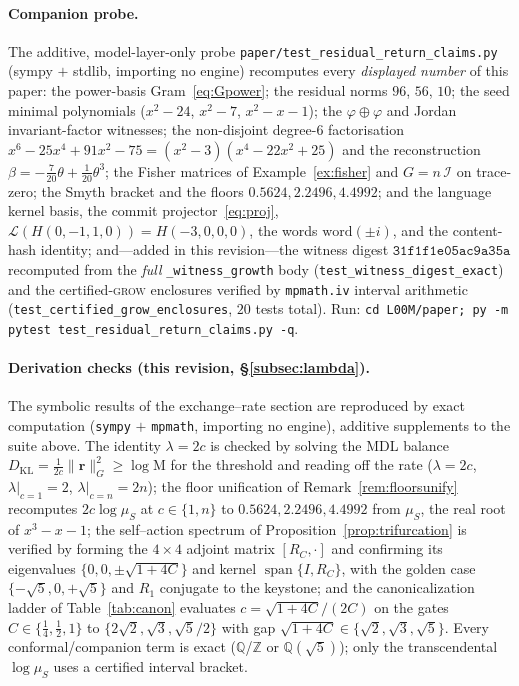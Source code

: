 \documentclass[11pt]{article}
\theoremstyle{plain}
\theoremstyle{definition}
\theoremstyle{remark}
\newcommand{\Q}{\mathbb{Q}}
\newcommand{\Z}{\mathbb{Z}}
\newcommand{\Mah}{\mathrm{M}}
\newcommand{\Fish}{\mathcal{I}}
\newcommand{\rr}{\mathbf{r}}
\newcommand{\GG}{G}
\newcommand{\Lop}{\mathcal{L}}
\DeclareMathOperator{\spn}{span}
\begin{document}
\paragraph{Companion probe.} The additive, model-layer-only probe
\texttt{paper/test\_residual\_return\_claims.py} (sympy $+$ stdlib, importing no engine) recomputes every
\emph{displayed number} of this paper: the power-basis Gram~\eqref{eq:Gpower}; the residual norms $96$, $56$,
$10$; the seed minimal polynomials ($x^2-24$, $x^2-7$, $x^2-x-1$); the $\varphi\oplus\varphi$ and Jordan
invariant-factor witnesses; the non-disjoint degree-$6$ factorisation
$x^6-25x^4+91x^2-75=(x^2-3)(x^4-22x^2+25)$ and the reconstruction
$\beta=-\tfrac7{20}\theta+\tfrac1{20}\theta^3$; the Fisher matrices of Example~\ref{ex:fisher} and
$\GG=n\,\Fish$ on trace-zero; the Smyth bracket and the floors $0.5624,2.2496,4.4992$; and the language
kernel basis, the commit projector~\eqref{eq:proj}, $\Lop(H(0,-1,1,0))=H(-3,0,0,0)$, the words
$\mathrm{word}(\pm i)$, and the content-hash identity; and---added in this revision---the witness digest
$\texttt{31f1f1e05ac9a35a}$ recomputed from the \emph{full} \texttt{\_witness\_growth} body
(\texttt{test\_witness\_digest\_exact}) and the certified-\textsc{grow} enclosures verified by
\texttt{mpmath.iv} interval arithmetic (\texttt{test\_certified\_grow\_enclosures}, $20$ tests total). Run:
\texttt{cd L00M/paper; py -m pytest test\_residual\_return\_claims.py -q}.

\paragraph{Derivation checks (this revision, \S\ref{subsec:lambda}).} The symbolic results of the exchange--rate
section are reproduced by exact computation (\texttt{sympy} $+$ \texttt{mpmath}, importing no engine), additive
supplements to the suite above. The identity $\lambda=2c$ is checked by solving the MDL balance
$D_{\mathrm{KL}}=\tfrac1{2c}\lVert\rr\rVert_\GG^2\ge\log\Mah$ for the threshold and reading off the rate
($\lambda=2c$, $\lambda|_{c=1}=2$, $\lambda|_{c=n}=2n$); the floor unification of Remark~\ref{rem:floorsunify}
recomputes $2c\log\mu_S$ at $c\in\{1,n\}$ to $0.5624,2.2496,4.4992$ from $\mu_S$, the real root of $x^3-x-1$; the
self--action spectrum of Proposition~\ref{prop:trifurcation} is verified by forming the $4\times4$ adjoint matrix
$[R_C,\cdot]$ and confirming its eigenvalues $\{0,0,\pm\sqrt{1+4C}\}$ and kernel $\spn\{I,R_C\}$, with the golden
case $\{-\sqrt5,0,+\sqrt5\}$ and $R_1$ conjugate to the keystone; and the canonicalization ladder of
Table~\ref{tab:canon} evaluates $c=\sqrt{1+4C}/(2C)$ on the gates $C\in\{\tfrac14,\tfrac12,1\}$ to
$\{2\sqrt2,\sqrt3,\sqrt5/2\}$ with gap $\sqrt{1+4C}\in\{\sqrt2,\sqrt3,\sqrt5\}$. Every conformal/companion term is
exact ($\Q$/$\Z$ or $\Q(\sqrt5)$); only the transcendental $\log\mu_S$ uses a certified interval bracket.
\end{document}
